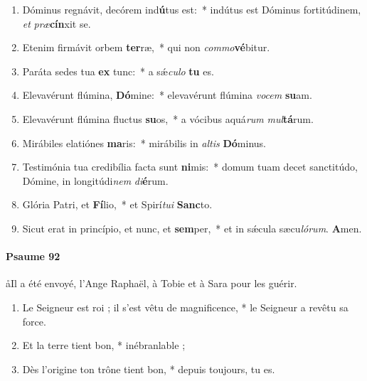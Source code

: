 \documentclass[twoside]{article}
\begin{document}
\begin{paracol}[1]{2}
\begin{enumerate}[wide, itemsep=0mm, labelwidth=!, labelindent=0pt, label=\color{gregoriocolor}\theenumi]
\item Dóminus regnávit, decórem ind\textbf{ú}tus est:~* indútus est Dóminus fortitúdinem, \textit{et} \textit{præ}\textbf{cín}xit se.
\item Etenim firmávit orbem \textbf{ter}ræ,~* qui non \textit{com}\textit{mo}\textbf{vé}bitur.
\item Paráta sedes tua \textbf{ex} tunc:~* a sǽ\textit{cu}\textit{lo} \textbf{tu} es.
\item Elevavérunt flúmina, \textbf{Dó}mine:~* elevavérunt flúmina \textit{vo}\textit{cem} \textbf{su}am.
\item Elevavérunt flúmina fluctus \textbf{su}os,~* a vócibus aquá\textit{rum} \textit{mul}\textbf{tá}rum.
\item Mirábiles elatiónes \textbf{ma}ris:~* mirábilis in \textit{al}\textit{tis} \textbf{Dó}minus.
\item Testimónia tua credibília facta sunt \textbf{ni}mis:~* domum tuam decet sanctitúdo, Dómine, in longitúdi\textit{nem} \textit{di}\textbf{é}rum.
\item Glória Patri, et \textbf{Fí}lio,~* et Spirí\textit{tu}\textit{i} \textbf{Sanc}to.
\item Sicut erat in princípio, et nunc, et \textbf{sem}per,~* et in sǽcula sæcu\textit{ló}\textit{rum}. \textbf{A}men.
\end{enumerate}

\switchcolumn


\paragraph{Psaume 92}
\aa Il a été envoyé, l’Ange Raphaël, à Tobie et à Sara pour les guérir.


\begin{enumerate}[wide, itemsep=0mm, labelwidth=!, labelindent=0pt, label=\color{gregoriocolor}\theenumi]

\item Le Seigneur est roi ; il s'est vêtu de magnificence, *
le Seigneur a revêtu sa force.

\item Et la terre tient bon, * inébranlable ;

\item Dès l'origine ton trône tient bon, *
depuis toujours, tu es.


\end{enumerate}
\end{paracol}
\end{document}
